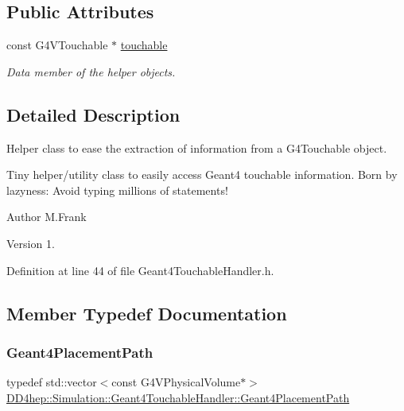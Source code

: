 \subsection*{Public Attributes}
\begin{DoxyCompactItemize}
\item 
const G4\+V\+Touchable $\ast$ \hyperlink{class_d_d4hep_1_1_simulation_1_1_geant4_touchable_handler_a33a2263e30f96abe93ee3be5a189c3b4}{touchable}
\begin{DoxyCompactList}\small\item\em Data member of the helper objects. \end{DoxyCompactList}\end{DoxyCompactItemize}


\subsection{Detailed Description}
Helper class to ease the extraction of information from a G4\+Touchable object. 

Tiny helper/utility class to easily access Geant4 touchable information. Born by lazyness\+: Avoid typing millions of statements!

\begin{DoxyAuthor}{Author}
M.\+Frank 
\end{DoxyAuthor}
\begin{DoxyVersion}{Version}
1. 
\end{DoxyVersion}


Definition at line 44 of file Geant4\+Touchable\+Handler.\+h.



\subsection{Member Typedef Documentation}
\hypertarget{class_d_d4hep_1_1_simulation_1_1_geant4_touchable_handler_a3ba887af055edecb3e6cfb04f2c7dc2c}{}\label{class_d_d4hep_1_1_simulation_1_1_geant4_touchable_handler_a3ba887af055edecb3e6cfb04f2c7dc2c} 
\subsubsection{\texorpdfstring{Geant4\+Placement\+Path}{Geant4PlacementPath}}
{\footnotesize\ttfamily typedef std\+::vector$<$const G4\+V\+Physical\+Volume$\ast$$>$ \hyperlink{class_d_d4hep_1_1_simulation_1_1_geant4_touchable_handler_a3ba887af055edecb3e6cfb04f2c7dc2c}{D\+D4hep\+::\+Simulation\+::\+Geant4\+Touchable\+Handler\+::\+Geant4\+Placement\+Path}}



